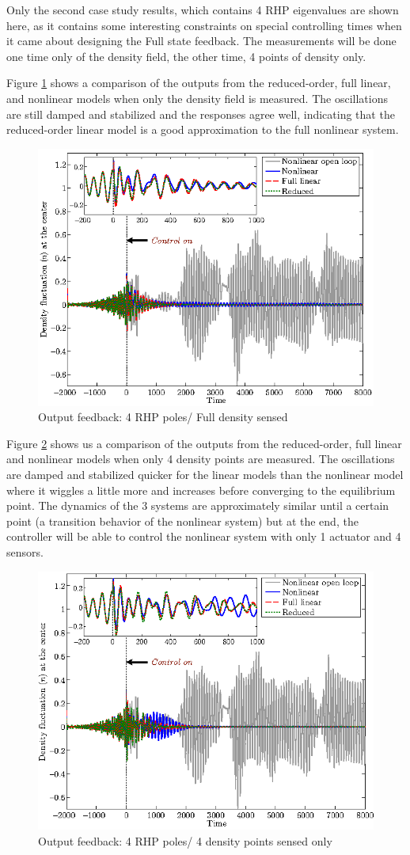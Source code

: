 \documentclass[12pt,lot, lof]{puthesis}
\begin{document}
Only the second case study results, which contains 4 RHP eigenvalues are shown here, as it contains some interesting constraints on special controlling times when it came about designing the Full state feedback.
The measurements will be done one time only  of the density field, the other time,  4 points of density only.

Figure \ref{lqg2} shows  a comparison of the outputs from the reduced-order, full linear, and nonlinear models when only the density field is measured. The oscillations are still damped and stabilized and the responses agree well, indicating that the reduced-order linear model is a good approximation to the full nonlinear system.
\begin{figure}[htb]
\centering
  \includegraphics[width=0.7 \linewidth]{observer2} 
  \caption{Output feedback: 4 RHP poles/ Full density sensed }
  \label{lqg2}
\end{figure}

Figure \ref{lqg3} shows us a comparison of the outputs from the reduced-order, full linear and nonlinear models when only 4 density points are measured. The oscillations are damped and stabilized quicker for the linear models than the nonlinear model where it wiggles a little more and increases before converging to the equilibrium point. The dynamics of the 3 systems are approximately similar until a certain point (a transition behavior of the nonlinear system) but at the end, the controller will be able to control the nonlinear system with only 1 actuator and 4 sensors.

\begin{figure}[htb]
\centering
\includegraphics[width=0.7 \linewidth]{observer3} 
\caption{Output feedback: 4 RHP poles/ 4 density points sensed only}
\label{lqg3}
\end{figure}
\end{document}
